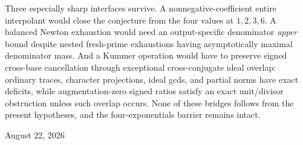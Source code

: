 \documentclass[11pt,oneside]{article}
\theoremstyle{definition}
\theoremstyle{remark}
\begin{document}
\begin{titlepage}
\begin{minipage}{0.9\textwidth}
Three especially sharp interfaces survive.  A nonnegative-coefficient entire interpolant
would close the conjecture from the four values at $1,2,3,6$.  A balanced Newton exhaustion
would need an output-specific denominator \emph{upper} bound despite nested fresh-prime
exhaustions having asymptotically maximal denominator mass.  And a Kummer operation would
have to preserve signed cross-base cancellation through exceptional cross-conjugate ideal
overlap: ordinary traces, character projections, ideal gcds, and partial norms have exact
deficits, while augmentation-zero signed ratios satisfy an exact unit/divisor obstruction
unless such overlap occurs.
None of these bridges follows from the present hypotheses, and the four-exponentials barrier
remains intact.
\end{minipage}
\vfill
{\large August 22, 2026\par}
\end{titlepage}

\end{document}
